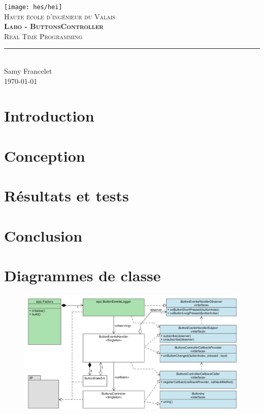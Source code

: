 \documentclass[11pt,titlepage]{report}
\begin{document}
\begin{titlepage}
	\centering
    \texttt{[image: hes/hei]}\\[1cm] 	%
    \textsc{\LARGE Haute école d'ingénieur du Valais}\\ \vspace{\fill}
    \textbf{\textsc{\fontsize{35}{35}\selectfont Labo - ButtonsController}}\\ \vspace{\fill}
	\textsc{\LARGE Real Time Programming}\\[0.4cm]
	\rule{\linewidth}{0.2 mm}\\[0.5cm]
	Samy Francelet \\
	\today
\end{titlepage}
\restoregeometry

\tableofcontents

\chapter{Introduction}


\chapter{Conception}


\chapter{Résultats et tests}


%

\chapter{Conclusion}


\appendix
\chapter{Diagrammes de classe}
\begin{figure}[H]
	\centering
	\includegraphics[angle=90, height=0.75\textheight]{Images/buttons/full_uml.PNG}
\end{figure}

\printbibliography[heading=bibintoc]
\end{document}
